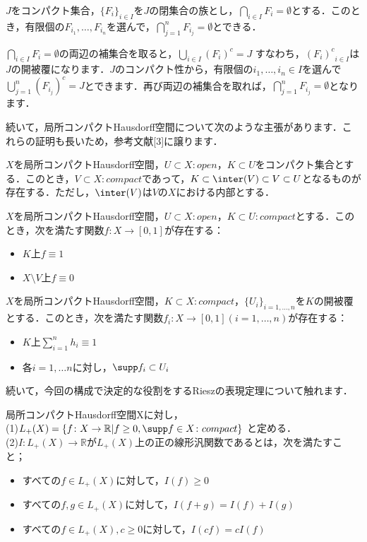 \begin{lem}\label{4}
$J$をコンパクト集合，$\{ F_i \}_{i \in I}$を$J$の閉集合の族とし，$\bigcap_{i \in I}F_i = \emptyset$とする．このとき，有限個の$F_{i_1}, \ldots , F_{i_n}$を選んで，$\bigcap_{j=1}^{n}F_{i_j} = \emptyset$とできる．
\end{lem}
\begin{Proof}
$\bigcap_{i \in I}F_i = \emptyset$の両辺の補集合を取ると，$\bigcup_{i \in I}(F_i)^{c} = J$ すなわち，${(F_i)^{c}}_{i \in I}$は$J$の開被覆になります．$J$のコンパクト性から，有限個の$i_1, \ldots , i_n \in I$を選んで$\bigcup_{j=1}^{n}(F_{i_j})^{c} = J$とできます．再び両辺の補集合を取れば，$\bigcap_{j=1}^{n}F_{i_j} = \emptyset$となります．
\end{Proof}
続いて，局所コンパクトHausdorff空間について次のような主張があります．これらの証明も長いため，参考文献[3]に譲ります．
\begin{thm}\label{5}
$X$を局所コンパクトHausdorff空間，$U \subset X \colon open$，$K \subset U$をコンパクト集合とする．このとき，$V \subset X :compact$であって，$K \subset \inter(V) \subset V \subset U$となるものが存在する．ただし，$\inter(V)$は$V$の$X$における内部とする．
\end{thm}
\begin{thm}[Urysohnの補題]\label{6}
$X$を局所コンパクトHausdorff空間，$U \subset X \colon open$，$K \subset U \colon compact$とする．このとき，次を満たす関数$f \colon X \to [0, 1]$が存在する：
\begin{itemize}
 \item $K$上$f \equiv 1$
 \item $X \setminus V$上$f \equiv 0$
\end{itemize}
\end{thm}
\begin{thm}[1の分割]\label{7}
$X$を局所コンパクトHausdorff空間，$K \subset X \colon compact$，$\{ U_i \}_{i=1, \ldots , n}$を$K$の開被覆とする．このとき，次を満たす関数$f_i \colon X \to [0,1] (i=1, \ldots , n)$が存在する：
\begin{itemize}
 \item $K$上$\sum_{i=1}^{n}h_i \equiv 1$
 \item 各$i=1, \ldots n$に対し，$\supp f_i \subset U_i$
\end{itemize}
\end{thm}
続いて，今回の構成で決定的な役割をするRieszの表現定理について触れます．
\begin{defi}\label{8}
局所コンパクトHausdorff空間Xに対し， \\
 (1)$L_{+}(X)= \{ f \colon X \to \mathbb{R} | f \ge 0, \supp f \in X \colon compact\}$ と定める． \\
 (2)$I \colon L_{+}(X) \to \mathbb{R}$が$L_{+}(X)$上の正の線形汎関数であるとは，次を満たすこと；
\begin{itemize}
 \item すべての$f \in L_{+}(X)$に対して，$I(f) \ge 0$
 \item すべての$f,g \in L_{+}(X)$に対して，$I(f+g)=I(f)+I(g)$
 \item すべての$f \in L_{+}(X), c \ge 0$に対して，$I(cf)=cI(f)$
\end{itemize}
\end{defi}
